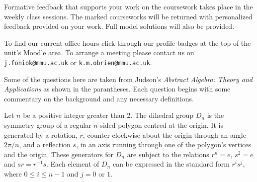 \documentclass[oneside,10pt]{amsart}
\begin{document}
Formative feedback that supports your work on the coursework takes place in the weekly class sessions. The marked courseworks will be returned with personalized feedback provided on your work. Full model solutions will also be provided.

To find our current office hours click through our profile badges at the top of the unit's Moodle area. To arrange a meeting please contact us on \texttt{j.foniok@mmu.ac.uk} or \texttt{k.m.obrien@mmu.ac.uk}.

Some of the questions here are taken from Judson's \textit{Abstract Algebra: Theory and Applications} as shown in the parantheses. Each question begins with some commentary on the background and any necessary definitions.

Let $n$ be a positive integer greater than 2. The dihedral group $D_n$ is the symmetry group of a regular $n$-sided polygon centred at the origin. It is generated by a rotation, $r$, counter-clockwise about the origin through an angle $2\pi/n$, and a reflection $s$, in an axis running through one of the polygon's vertices and the origin. These generators for $D_n$ are subject to the relations $r^n = e$, $s^2 = e$ and $sr = r^{-1}s$. Each element of $D_n$ can be expressed in the standard form $r^i s^j$, where $0 \leq i \leq n-1$ and $j=0$ or $1$.
\end{document}
